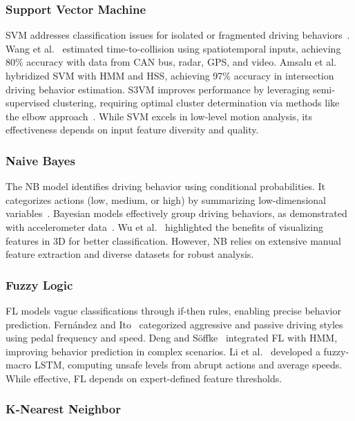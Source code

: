 \subsubsection{Support Vector Machine}

\gls{SVM} addresses classification issues for isolated or fragmented driving behaviors~\cite{Li2017}. 
Wang et al.~\cite{Wang2020} estimated time-to-collision using spatiotemporal inputs, achieving 80\% accuracy with data from CAN bus, radar, GPS, and video. 
Amsalu et al.~\cite{Amsalu2015} hybridized \gls{SVM} with \gls{HMM} and \gls{HSS}, achieving 97\% accuracy in intersection driving behavior estimation. 
\gls{S3VM} improves performance by leveraging semi-supervised clustering, requiring optimal cluster determination via methods like the elbow approach~\cite{Yang2021, Wang2017}. 
While \gls{SVM} excels in low-level motion analysis, its effectiveness depends on input feature diversity and quality.

\subsubsection{Naive Bayes}

The \gls{NB} model identifies driving behavior using conditional probabilities. 
It categorizes actions (low, medium, or high) by summarizing low-dimensional variables~\cite{Bouslimi2005}. 
Bayesian models effectively group driving behaviors, as demonstrated with accelerometer data~\cite{chen2015d}. 
Wu et al.~\cite{Wu2018} highlighted the benefits of visualizing features in 3D for better classification. 
However, \gls{NB} relies on extensive manual feature extraction and diverse datasets for robust analysis.

\subsubsection{Fuzzy Logic}

\gls{FL} models vague classifications through if-then rules, enabling precise behavior prediction. 
Fernández and Ito~\cite{Fernandez2016} categorized aggressive and passive driving styles using pedal frequency and speed. 
Deng and Söffke~\cite{deng2018improved} integrated \gls{FL} with \gls{HMM}, improving behavior prediction in complex scenarios. 
Li et al.~\cite{Li2022} developed a fuzzy-macro \gls{LSTM}, computing unsafe levels from abrupt actions and average speeds. 
While effective, \gls{FL} depends on expert-defined feature thresholds.

\subsubsection{K-Nearest Neighbor}

